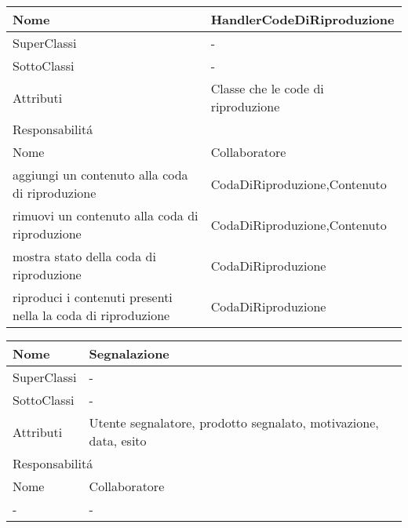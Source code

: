 \begin{center}
    \begin{tabular}{ |p{3cm}|p{3cm}|p{3cm}|p{3cm}| }
        \hline
        Nome & \multicolumn{3}{|p{9cm}|}{HandlerCodeDiRiproduzione} \\\hline
        SuperClassi & \multicolumn{3}{|p{9cm}|}{-} \\\hline
        SottoClassi & \multicolumn{3}{|p{9cm}|}{-} \\\hline
        Attributi & \multicolumn{3}{|p{9cm}|}{Classe che le code di riproduzione} \\\hline
        \multicolumn{4}{|p{12cm}|}{Responsabilit\'a} \\\hline
        \multicolumn{2}{|p{6cm}|}{Nome} & \multicolumn{2}{|p{6cm}|}{Collaboratore} \\\hline
        \multicolumn{2}{|p{6cm}|}{aggiungi un contenuto alla coda di riproduzione} & \multicolumn{2}{|p{6cm}|}{CodaDiRiproduzione,Contenuto} \\\hline
        \multicolumn{2}{|p{6cm}|}{rimuovi un contenuto alla coda di riproduzione} & \multicolumn{2}{|p{6cm}|}{CodaDiRiproduzione,Contenuto} \\\hline
        \multicolumn{2}{|p{6cm}|}{mostra stato della coda di riproduzione} & \multicolumn{2}{|p{6cm}|}{CodaDiRiproduzione} \\\hline
        \multicolumn{2}{|p{6cm}|}{riproduci i contenuti presenti nella la coda di riproduzione} & \multicolumn{2}{|p{6cm}|}{CodaDiRiproduzione} \\\hline
    \end{tabular}
\end{center}


\begin{center}
    \begin{tabular}{ |p{3cm}|p{3cm}|p{3cm}|p{3cm}| }
        \hline
        Nome & \multicolumn{3}{|p{9cm}|}{Segnalazione} \\\hline
        SuperClassi & \multicolumn{3}{|p{9cm}|}{-} \\\hline
        SottoClassi & \multicolumn{3}{|p{9cm}|}{-} \\\hline
        Attributi & \multicolumn{3}{|p{9cm}|}{Utente segnalatore, prodotto segnalato, motivazione, data, esito} \\\hline
        \multicolumn{4}{|p{12cm}|}{Responsabilit\'a} \\\hline
        \multicolumn{2}{|p{6cm}|}{Nome} & \multicolumn{2}{|p{6cm}|}{Collaboratore} \\\hline
        \multicolumn{2}{|p{6cm}|}{-} & \multicolumn{2}{|p{6cm}|}{-} \\\hline
    \end{tabular}
\end{center}


